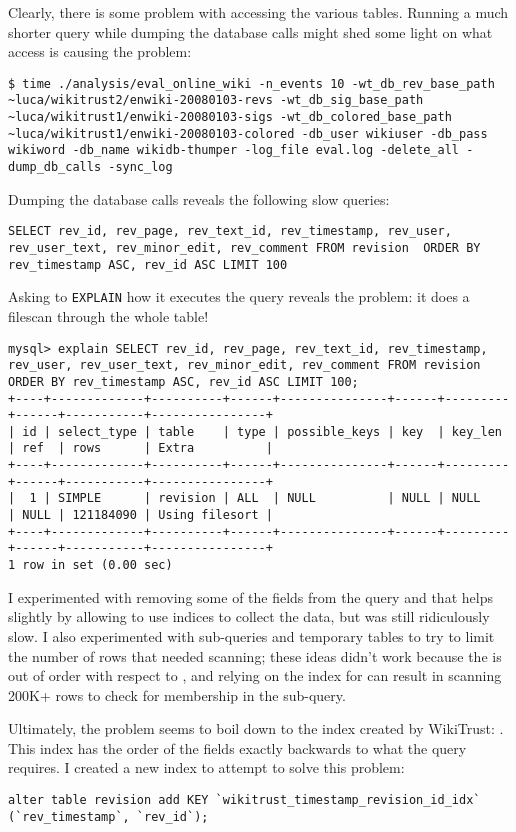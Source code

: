 Clearly, there is some problem with \mysql accessing the
various tables.
Running a much shorter query while dumping the database calls
might shed some light on what access is causing the problem:
\begin{verbatim}
$ time ./analysis/eval_online_wiki -n_events 10 -wt_db_rev_base_path ~luca/wikitrust2/enwiki-20080103-revs -wt_db_sig_base_path ~luca/wikitrust1/enwiki-20080103-sigs -wt_db_colored_base_path ~luca/wikitrust1/enwiki-20080103-colored -db_user wikiuser -db_pass wikiword -db_name wikidb-thumper -log_file eval.log -delete_all -dump_db_calls -sync_log
\end{verbatim}
Dumping the database calls reveals the following slow queries:
\begin{verbatim}
SELECT rev_id, rev_page, rev_text_id, rev_timestamp, rev_user, rev_user_text, rev_minor_edit, rev_comment FROM revision  ORDER BY rev_timestamp ASC, rev_id ASC LIMIT 100
\end{verbatim}

Asking \mysql to \texttt{EXPLAIN} how it executes the query
reveals the problem: it does a filescan through the whole table!
\begin{verbatim}
mysql> explain SELECT rev_id, rev_page, rev_text_id, rev_timestamp, rev_user, rev_user_text, rev_minor_edit, rev_comment FROM revision  ORDER BY rev_timestamp ASC, rev_id ASC LIMIT 100;
+----+-------------+----------+------+---------------+------+---------+------+-----------+----------------+
| id | select_type | table    | type | possible_keys | key  | key_len | ref  | rows      | Extra          |
+----+-------------+----------+------+---------------+------+---------+------+-----------+----------------+
|  1 | SIMPLE      | revision | ALL  | NULL          | NULL | NULL    | NULL | 121184090 | Using filesort |
+----+-------------+----------+------+---------------+------+---------+------+-----------+----------------+
1 row in set (0.00 sec)
\end{verbatim}
I experimented with removing some of the fields from the query
and that helps slightly by allowing \mysql to use indices to
collect the data, but was still ridiculously slow.
I also experimented with sub-queries and temporary tables
to try to limit the number of rows that needed scanning;
these ideas didn't work because the  is out
of order with respect to , and relying
on the index for  can result in scanning
200K+ rows to check for membership in the sub-query.

Ultimately, the problem seems to boil down to the index
created by WikiTrust: .
This index has the order of the fields exactly backwards
to what the query requires.
I created a new index to attempt to solve this problem:
\begin{verbatim}
alter table revision add KEY `wikitrust_timestamp_revision_id_idx` (`rev_timestamp`, `rev_id`);
\end{verbatim}

